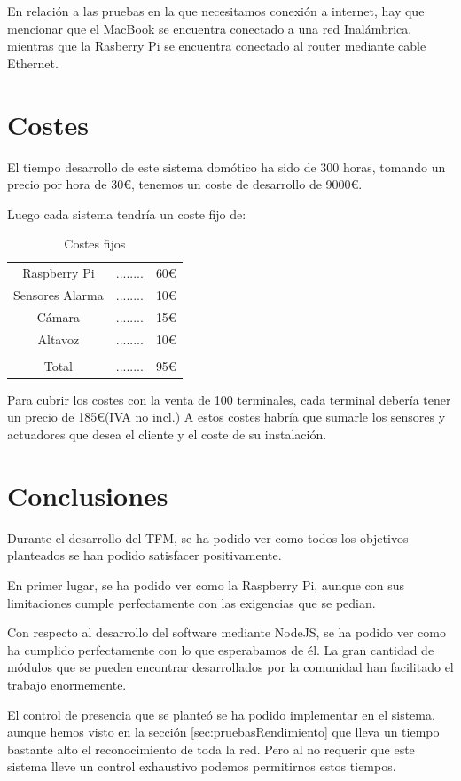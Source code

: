 \documentclass[10pt,journal,compsoc]{IEEEtran}
\begin{document}
En relación a las pruebas en la que necesitamos conexión a internet, 
hay que mencionar que el MacBook se encuentra conectado a una red Inalámbrica, 
mientras que la Rasberry Pi se encuentra conectado al router mediante cable Ethernet. 

\section{Costes}
El tiempo desarrollo de este sistema domótico ha sido de 300 horas, tomando un 
precio por hora de 30\euro, tenemos un coste de desarrollo de 9000\euro.

Luego cada sistema tendría un coste fijo de:
\begin{table}[h]
\centering
\begin{tabular}{ccc}
Raspberry Pi & ........ & 60\euro \\
Sensores Alarma & ........ & 10\euro \\
Cámara & ........ & 15\euro \\
Altavoz & ........ & 10\euro \\
\hline \\
Total & ........ & 95\euro \\
\end{tabular} 
\caption{Costes fijos}
\label{tab:CostesFij}
\end{table}

Para cubrir los costes con la venta de 100 terminales, cada terminal debería tener un precio de 
185\euro (IVA no incl.)
A estos costes habría que sumarle los sensores y actuadores que desea el cliente y el coste 
de su instalación.

\section{Conclusiones}
Durante el desarrollo del TFM, se ha podido ver como todos los objetivos 
planteados se han podido satisfacer positivamente.

En primer lugar, se ha podido ver como la Raspberry Pi, aunque con sus 
limitaciones cumple perfectamente con las exigencias que se pedian.

Con respecto al desarrollo del software mediante NodeJS, se ha podido ver como 
ha cumplido perfectamente con lo que esperabamos de él. La gran cantidad de 
módulos que se pueden encontrar desarrollados por la comunidad han facilitado el 
trabajo enormemente.

El control de presencia que se planteó se ha podido implementar en el sistema, 
aunque hemos visto en la sección \ref{sec:pruebasRendimiento} que lleva un 
tiempo bastante alto el reconocimiento de toda la red. Pero al no requerir que 
este sistema lleve un control exhaustivo podemos permitirnos estos tiempos.
\end{document}
